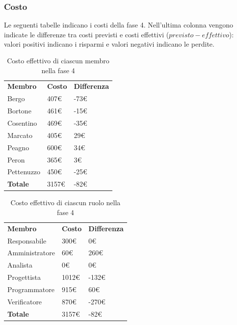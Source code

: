 	\subsubsection{Costo}
		Le seguenti tabelle indicano i costi della fase 4. Nell'ultima colonna vengono indicate le differenze tra costi previsti e costi effettivi ($previsto - effettivo$): valori positivi indicano i risparmi e valori negativi indicano le perdite.
		
		\begin{table}[H]
			\centering
			\begin{tabular}{| l | l | l |}
				\rowcolor{LightBlue}
				\textbf{\color{white}Membro}
				& \textbf{\color{white}Costo}
				& \textbf{\color{white}Differenza}\\
				Bergo		& 407€	& -73€\\
				Bortone		& 461€	& -15€\\
				Cosentino	& 469€	& -35€\\
				Marcato		& 405€	& 29€\\
				Peagno		& 600€	& 34€\\
				Peron		& 365€	& 3€\\
				Pettenuzzo	& 450€	& -25€\\ \hline
				\textbf{Totale} & 3157€	& -82€\\ \hline
			\end{tabular}
			\caption{Costo effettivo di ciascun membro nella fase 4}	
		\end{table}
		
	\begin{table}[H]
		\centering
		\begin{tabular}{| l | l |l|}
			\rowcolor{LightBlue}
			\textbf{\color{white}Membro}
			& \textbf{\color{white}Costo}
			& \textbf{\color{white}Differenza}\\
			
			Responsabile	& 300€	& 0€\\
			Amministratore 	& 60€ 	& 260€\\
			Analista 		& 0€ 	& 0€\\
			Progettista 	& 1012€	& -132€\\
			Programmatore 	& 915€	& 60€\\
			Verificatore 	& 870€	& -270€\\ \hline
			\textbf{Totale} & 3157€	& -82€\\ \hline
		\end{tabular}
		\caption{Costo effettivo di ciascun ruolo nella fase 4}
	\end{table}
	
